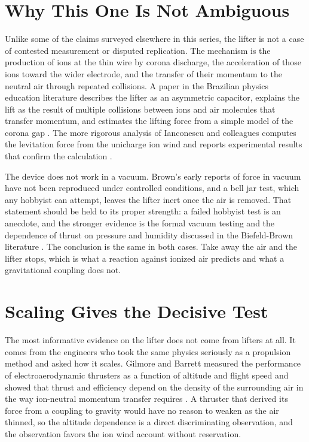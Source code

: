 \documentclass[11pt]{article}
\begin{document}
\section{Why This One Is Not Ambiguous}

Unlike some of the claims surveyed elsewhere in this series, the lifter is not a case of contested measurement or disputed replication. The mechanism is the production of ions at the thin wire by corona discharge, the acceleration of those ions toward the wider electrode, and the transfer of their momentum to the neutral air through repeated collisions. A paper in the Brazilian physics education literature describes the lifter as an asymmetric capacitor, explains the lift as the result of multiple collisions between ions and air molecules that transfer momentum, and estimates the lifting force from a simple model of the corona gap \cite{L2015}. The more rigorous analysis of Ianconescu and colleagues computes the levitation force from the unicharge ion wind and reports experimental results that confirm the calculation \cite{ISM2011}.

The device does not work in a vacuum. Brown's early reports of force in vacuum have not been reproduced under controlled conditions, and a bell jar test, which any hobbyist can attempt, leaves the lifter inert once the air is removed. That statement should be held to its proper strength: a failed hobbyist test is an anecdote, and the stronger evidence is the formal vacuum testing and the dependence of thrust on pressure and humidity discussed in the Biefeld-Brown literature \cite{T2004}. The conclusion is the same in both cases. Take away the air and the lifter stops, which is what a reaction against ionized air predicts and what a gravitational coupling does not.

\section{Scaling Gives the Decisive Test}

The most informative evidence on the lifter does not come from lifters at all. It comes from the engineers who took the same physics seriously as a propulsion method and asked how it scales. Gilmore and Barrett measured the performance of electroaerodynamic thrusters as a function of altitude and flight speed and showed that thrust and efficiency depend on the density of the surrounding air in the way ion-neutral momentum transfer requires \cite{GB2018}. A thruster that derived its force from a coupling to gravity would have no reason to weaken as the air thinned, so the altitude dependence is a direct discriminating observation, and the observation favors the ion wind account without reservation.
\end{document}
